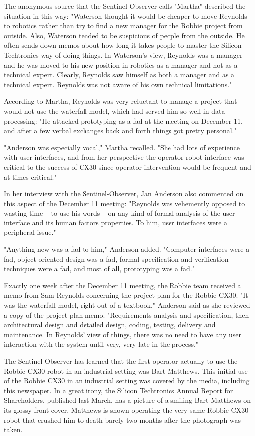 The anonymous source that the Sentinel-Observer calls "Martha" described the situation in this way: "Waterson thought it would be cheaper to move Reynolds to robotics rather than try to find a new manager for the Robbie project from outside. Also, Waterson tended to be suspicious of people from the outside. He often sends down memos about how long it takes people to master the Silicon Techtronics way of doing things. In Waterson's view, Reynolds was a manager and he was moved to his new position in robotics as a manager and not as a technical expert. Clearly, Reynolds saw himself as both a manager and as a technical expert. Reynolds was not aware of his own technical limitations."

According to Martha, Reynolds was very reluctant to manage a project that would not use the waterfall model, which had served him so well in data processing: "He attacked prototyping as a fad at the meeting on December 11, and after a few verbal exchanges back and forth things got pretty personal."

"Anderson was especially vocal," Martha recalled. "She had lots of experience with user interfaces, and from her perspective the operator-robot interface was critical to the success of CX30 since operator intervention would be frequent and at times critical."

In her interview with the Sentinel-Observer, Jan Anderson also commented on this aspect of the December 11 meeting: "Reynolds was vehemently opposed to wasting time -- to use his words -- on any kind of formal analysis of the user interface and its human factors properties. To him, user interfaces were a peripheral issue."

"Anything new was a fad to him," Anderson added. "Computer interfaces were a fad, object-oriented design was a fad, formal specification and verification techniques were a fad, and most of all, prototyping was a fad."

Exactly one week after the December 11 meeting, the Robbie team received a memo from Sam Reynolds concerning the project plan for the Robbie CX30. "It was the waterfall model, right out of a textbook," Anderson said as she reviewed a copy of the project plan memo. "Requirements analysis and specification, then architectural design and detailed design, coding, testing, delivery and maintenance. In Reynolds' view of things, there was no need to have any user interaction with the system until very, very late in the process."

The Sentinel-Observer has learned that the first operator actually to use the Robbie CX30 robot in an industrial setting was Bart Matthews. This initial use of the Robbie CX30 in an industrial setting was covered by the media, including this newspaper. In a great irony, the Silicon Techtronics Annual Report for Shareholders, published last March, has a picture of a smiling Bart Matthews on its glossy front cover. Matthews is shown operating the very same Robbie CX30 robot that crushed him to death barely two months after the photograph was taken.
